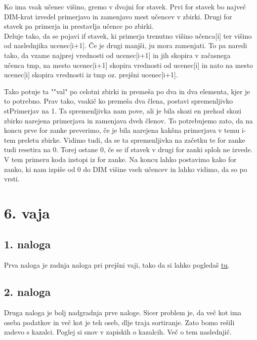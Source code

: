 \documentclass[a4paper, 12pt]{article}
\begin{document}
Ko ima vsak učenec višino, gremo v dvojni for stavek. Prvi for stavek bo največ DIM-krat izvedel primerjavo in zamenjavo mest učencev v zbirki. Drugi for stavek pa primerja in prestavlja učence po zbirki.\\
Deluje tako, da se pojavi if stavek, ki primerja trenutno višino učenca[i] ter višino od naslednjika ucenec[i+1]. Če je drugi manjši, ju mora zamenjati. To pa naredi tako, da vzame najprej vrednosti od ucenec[i+1] in jih skopira v začasnega učenca tmp, na mesto ucenec[i+1] skopira vrednosti od ucenec[i] in nato na mesto ucenec[i] skopira vrednosti iz tmp oz. prejšni ucenec[i+1].\

Tako potuje ta ""val" po celotni zbirki in premeša po dva in dva elementa, kjer je to potrebno. Prav tako, vsakič ko premeša dva člena, postavi spremenljivko stPrimerjav na 1. Ta spremenljivka nam pove, ali je bila skozi en prehod skozi zbirko narejena primerjava in zamenjava dveh členov. To potrebujemo zato, da na koncu prve for zanke preverimo, če je bila narejena kakšna primerjava v temu i-tem preletu zbirke. Vidimo tudi, da se ta spremenljivka na začetku te for zanke tudi resetira na 0. Torej ostane 0, če se if stavek v drugi for zanki sploh ne izvede. V tem primeru koda izstopi iz for zanke. Na koncu lahko postavimo kako for zanko, ki nam izpiše od 0 do DIM višine vseh učencev in lahko vidimo, da so po vrsti.

\section*{6. vaja}

\subsection*{1. naloga}

Prva naloga je zadnja naloga pri prejšni vaji, tako da si lahko pogledaš \hyperref[sec:5.3]{tu}.

\subsection*{2. naloga}
\label{sortbuble}
Druga naloga je bolj nadgradnja prve naloge. Sicer problem je, da več kot ima oseba podatkov in več kot je teh oseb, dlje traja sortiranje. Zato bomo rešili zadevo s kazalci. Poglej si snov v zapiskih o kazalcih. Več o tem naslednjič.

\end{document}
